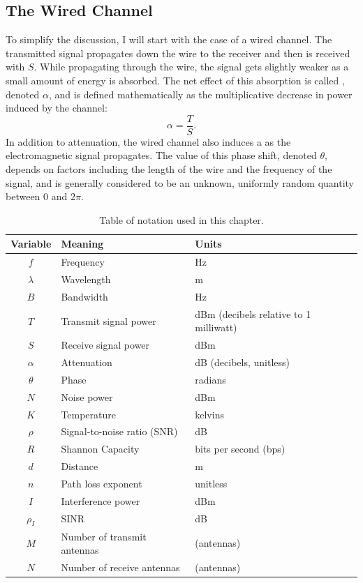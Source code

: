 \subsection{The Wired Channel}
To simplify the discussion, I will start with the case of a wired channel. The transmitted signal propagates down the wire to the receiver and then is received with  $S$. While propagating through the wire, the signal gets slightly weaker as a small amount of energy is absorbed. The net effect of this absorption is called , denoted $\alpha$, and is defined mathematically as the multiplicative decrease in power induced by the channel:
\begin{equation}
	\label{eq:attenuation}
	\alpha = \frac{T}{S}.
\end{equation}
In addition to attenuation, the wired channel also induces a  as the electromagnetic signal propagates. The value of this phase shift, denoted $\theta$, depends on factors including the length of the wire and the frequency of the signal, and is generally considered to be an unknown, uniformly random quantity between $0$ and $2\pi$.

\begin{table}
\centering
\begin{tabular}{cll}
\toprule%
Variable & Meaning & Units\\
\midrule%
$f$ & Frequency & Hz \\
$\lambda$ & Wavelength & m \\
$B$ & Bandwidth & Hz \\
$T$ & Transmit signal power & dBm (decibels relative to 1 milliwatt) \\
$S$ & Receive signal power & dBm \\
$\alpha$ & Attenuation & dB (decibels, unitless) \\
$\theta$ & Phase & radians \\
$N$ & Noise power & dBm \\
$K$ & Temperature & kelvins \\
$\rho$ & Signal-to-noise ratio (SNR) & dB \\
$R$ & Shannon Capacity & bits per second (bps) \\
$d$ & Distance & m \\
$n$ & Path loss exponent & unitless \\
$I$ & Interference power & dBm \\
$\rho_I$ & SINR & dB \\
$M$ & Number of transmit antennas & (antennas) \\
$N$ & Number of receive antennas & (antennas)\\
\bottomrule
\end{tabular}
\caption[Table of notation used in this chapter]{\label{tab:bg_notation}Table of notation used in this chapter.}
\end{table}

